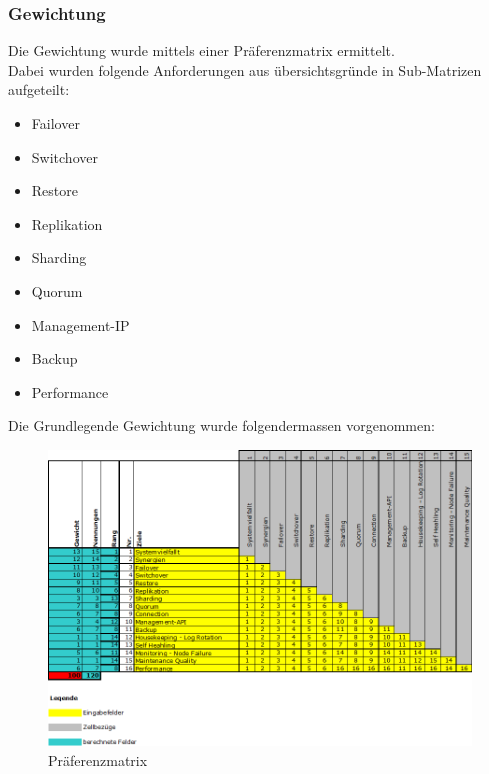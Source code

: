 \subsubsection{Gewichtung}
\begin{flushleft}
    Die Gewichtung wurde mittels einer Präferenzmatrix ermittelt.\\
    Dabei wurden folgende Anforderungen aus übersichtsgründe in Sub-Matrizen aufgeteilt:
    \begin{itemize}
        \item Failover
        \item Switchover
        \item Restore
        \item Replikation
        \item Sharding
        \item Quorum
        \item Management-IP
        \item Backup
        \item Performance
    \end{itemize}

    Die Grundlegende Gewichtung wurde folgendermassen vorgenommen:
    \begin{figure}[H]
        \centering
        \includegraphics[width=1\linewidth]{source/implementation/evaluation/requirements/preference_matrix}
        \caption{Präferenzmatrix}
        \label{fig:preference_matrix}
    \end{figure}
\end{flushleft}
